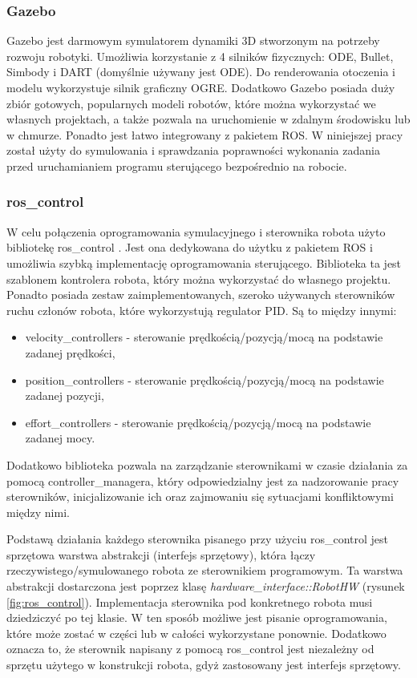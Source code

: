 \documentclass[a4paper, 12pt, twoside]{article}
\begin{document}
\subsubsection{Gazebo}

Gazebo jest darmowym symulatorem dynamiki 3D stworzonym na potrzeby rozwoju robotyki. Umożliwia korzystanie z 4 silników fizycznych: ODE, Bullet, Simbody i DART (domyślnie używany jest ODE). Do renderowania otoczenia i modelu wykorzystuje silnik graficzny OGRE. Dodatkowo Gazebo posiada duży zbiór gotowych, popularnych modeli robotów, które można wykorzystać we własnych projektach, a także pozwala na uruchomienie w zdalnym środowisku lub w chmurze. Ponadto jest łatwo integrowany z pakietem ROS. W niniejszej pracy został użyty do symulowania i sprawdzania poprawności wykonania zadania przed uruchamianiem programu sterującego bezpośrednio na robocie.

\subsubsection{ros\_control}

W celu połączenia oprogramowania symulacyjnego i sterownika robota użyto bibliotekę ros\_control \cite{roscontrol} \cite{roscontrolart}. Jest ona dedykowana do użytku z pakietem ROS i umożliwia szybką implementację oprogramowania sterującego. Biblioteka ta jest szablonem kontrolera robota, który można wykorzystać do własnego projektu. Ponadto posiada zestaw zaimplementowanych, szeroko używanych sterowników ruchu członów robota, które wykorzystują regulator PID. Są to między innymi:

\begin{itemize}
\item velocity\_controllers - sterowanie prędkością/pozycją/mocą na podstawie zadanej prędkości,
\item position\_controllers - sterowanie prędkością/pozycją/mocą na podstawie zadanej pozycji,
\item effort\_controllers - sterowanie prędkością/pozycją/mocą na podstawie zadanej mocy.
\end{itemize}

Dodatkowo biblioteka pozwala na zarządzanie sterownikami w czasie działania za pomocą controller\_managera, który odpowiedzialny jest za nadzorowanie pracy sterowników, inicjalizowanie ich oraz zajmowaniu się sytuacjami konfliktowymi między nimi.

Podstawą działania każdego sterownika pisanego przy użyciu ros\_control jest sprzętowa warstwa abstrakcji (interfejs sprzętowy), która łączy rzeczywistego/symulowanego robota ze sterownikiem programowym. Ta warstwa abstrakcji dostarczona jest poprzez klasę \textit{hardware\_interface::RobotHW} (rysunek \ref{fig:ros_control}). Implementacja sterownika pod konkretnego robota musi dziedziczyć po tej klasie. W ten sposób możliwe jest pisanie oprogramowania, które może zostać w części lub w całości wykorzystane ponownie. Dodatkowo oznacza to, że sterownik napisany z pomocą ros\_control jest niezależny od sprzętu użytego w konstrukcji robota, gdyż zastosowany jest interfejs sprzętowy.
\end{document}

